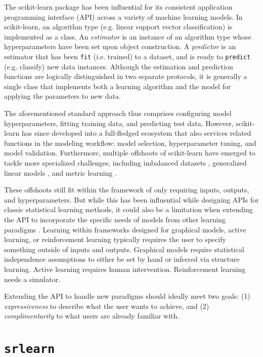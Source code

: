 \documentclass[letterpaper]{article}
\begin{document}
The scikit-learn package \cite{pedregosa2011scikit} has been influential
for its consistent application programming interface (API) across a variety of machine learning models.
In scikit-learn, an algorithm type (e.g. linear support vector classification) is implemented as a class.
An \textit{estimator} is an instance of an algorithm type whose hyperparameters have been set upon object construction.
A \textit{predictor} is an estimator that has been \texttt{fit} (i.e. trained) to a dataset, and is ready to \texttt{predict} (e.g. classify) new data instances.
Although the estimation and prediction functions are logically distinguished in two separate protocols, it is generally a single class that implements both a learning algorithm and the model for applying the parameters to new data.

The aforementioned standard approach thus comprises configuring model hyperparameters, fitting training data, and predicting test data.
However, scikit-learn has since developed into a full-fledged ecosystem that also services related functions in the modeling workflow: model selection, hyperparameter tuning, and model validation.
Furthermore, multiple offshoots of scikit-learn have emerged to tackle more specialized challenges, including imbalanced datasets \cite{lemaitre2017imbalancedlearn},  generalized linear models \cite{blondel2016lightning}, and metric learning \cite{vazelhes2019metric}.

These offshoots still fit within the framework of only requiring inputs, outputs, and hyperparameters. But while this has been influential while designing APIs for classic statistical learning methods, it could also be a limitation when extending the API to incorporate the specific needs of models from other learning paradigms \cite{buitinck2013apidesign}.
Learning within frameworks designed for graphical models, active learning, or reinforcement learning typically requires the user to specify something outside of inputs and outputs.
Graphical models require statistical independence assumptions to either be set by hand or inferred via structure learning.
Active learning requires human intervention.
Reinforcement learning needs a simulator.

Extending the API to handle new paradigms should ideally meet two goals:
(1) \textit{expressiveness} to describe what the user wants to achieve, and
(2) \textit{complimentarity} to what users are already familiar with.

\section{\texttt{srlearn}}
\end{document}
